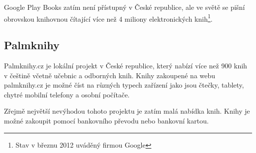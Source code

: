 Google Play Books zatím není přístupný v České republice, ale ve světě se pišní obrovskou knihovnou čítající více než 4 miliony elektronických knih\footnote{Stav v březnu 2012 uváděný firmou Google}.

\subsection{Palmknihy}
Palmknihy.cz je lokální projekt v České republice, který nabízí více než 900 knih v češtině včetně učebnic a odborných knih. Knihy zakoupené na webu palmknihy.cz je možné číst na různých typech zařízení jako jsou čtečky, tablety, chytré mobilní telefony a osobní počítače. 

Zřejmě největší nevýhodou tohoto projektu je zatím malá nabídka knih. Knihy je možné zakoupit pomocí bankovního převodu nebo bankovní kartou. 

